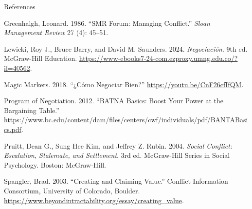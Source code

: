\documentclass[
  ignorenonframetext,
]{beamer}
\newlength{\cslhangindent}
\newenvironment{CSLReferences}[2] %
 {\begin{list}{}{%
  \setlength{\itemindent}{0pt}
  \setlength{\leftmargin}{0pt}
  \setlength{\parsep}{0pt}
  \ifodd #1
   \setlength{\leftmargin}{\cslhangindent}
   \setlength{\itemindent}{-1\cslhangindent}
  \fi
  \setlength{\itemsep}{#2\baselineskip}}}
 {\end{list}}
\begin{document}
\begin{frame}[allowframebreaks]{References}
\label{refs}
\begin{CSLReferences}{1}{0}
Greenhalgh, Leonard. 1986. {``{SMR} {Forum}: {Managing} {Conflict}.''}
\emph{Sloan Management Review} 27 (4): 45--51.

Lewicki, Roy J., Bruce Barry, and David M. Saunders. 2024.
\emph{Negociación}. 9th ed. McGraw-Hill Education.
\url{https://www-ebooks7-24-com.ezproxy.umng.edu.co/?il=40562}.

Magic Markers. 2018. {``¿{Cómo} Negociar Bien?''}
\url{https://youtu.be/CnF26cfIfQM}.

Program of Negotiation. 2012. {``{BATNA} {Basics}: {Boost} {Your}
{Power} at the {Bargaining} {Table}.''}
\url{https://www.bc.edu/content/dam/files/centers/cwf/individuals/pdf/BANTABasics.pdf}.

Pruitt, Dean G., Sung Hee Kim, and Jeffrey Z. Rubin. 2004. \emph{Social
Conflict: Escalation, Stalemate, and Settlement}. 3rd ed.
{McGraw}-{Hill} Series in Social Psychology. Boston: McGraw-Hill.

Spangler, Brad. 2003. {``Creating and {Claiming} {Value}.''} Conflict
Information Consortium, University of Colorado, Boulder.
\url{https://www.beyondintractability.org/essay/creating_value}.

\end{CSLReferences}
\end{frame}
\end{document}
